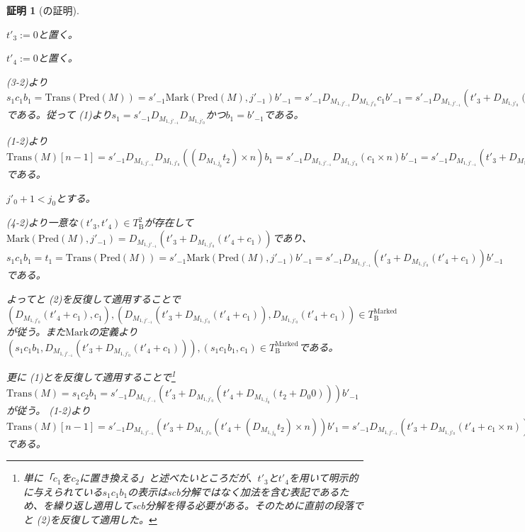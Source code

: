 \documentclass[dvipdfmx,uplatex]{jsarticle}
\theoremstyle{customnonumberbreakfortheorem}
\theoremstyle{customnonumberbreakforproof}
\newtheorem{hideableproof}{証明}
\begin{document}
\begin{hideableproof}[の証明]
\begin{indented}
\begin{indented}
\begin{indented}
				\begin{indented}
					\item \(t'_3 := 0\)と置く。
					\item \(t'_4 := 0\)と置く。
					\item {} (3-2)より\(s_1 c_1 b_1 = \textrm{Trans}(\textrm{Pred}(M)) = s'_{-1} \textrm{Mark}(\textrm{Pred}(M),j'_{-1}) b'_{-1} = s'_{-1} D_{M_{1,j'_{-1}}} D_{M_{1,j'_0}} c_1 b'_{-1} = s'_{-1} D_{M_{1,j'_{-1}}}(t'_3 + D_{M_{1,j'_0}}(t'_4+c_1)) b'_{-1}\)である。従って (1)より\(s_1 = s'_{-1} D_{M_{1,j'_{-1}}} D_{M_{1,j'_0}}\)かつ\(b_1 = b'_{-1}\)である。
					\item {} (1-2)より\(\textrm{Trans}(M)[n-1] = s'_{-1} D_{M_{1,j'_{-1}}} D_{M_{1,j'_0}}((D_{M_{1,j_0}} t_2) \times n) b_1 = s'_{-1} D_{M_{1,j'_{-1}}} D_{M_{1,j'_0}}(c_1 \times n) b'_{-1} = s'_{-1} D_{M_{1,j'_{-1}}}(t'_3 + D_{M_{1,j'_0}}(t'_4 + c_1 \times n)) b'_{-1}\)である。
				\end{indented}
				\item \(j'_0+1 < j_0\)とする。
				\begin{indented}
					\item {} (4-2)より一意な\((t'_3,t'_4) \in T_{\textrm{B}}^2\)が存在して\(\textrm{Mark}(\textrm{Pred}(M),j'_{-1}) = D_{M_{1,j'_{-1}}}(t'_3 + D_{M_{1,j'_0}}(t'_4+c_1))\)であり、\(s_1 c_1 b_1 = t_1 = \textrm{Trans}(\textrm{Pred}(M)) = s'_{-1} \textrm{Mark}(\textrm{Pred}(M),j'_{-1}) b'_{-1} = s'_{-1} D_{M_{1,j'_{-1}}}(t'_3 + D_{M_{1,j'_0}}(t'_4+c_1)) b'_{-1}\)である。
					\item よってと (2)を反復して適用することで\((D_{M_{1,j'_0}}(t'_4+c_1),c_1), (D_{M_{1,j'_{-1}}}(t'_3 + D_{M_{1,j'_0}}(t'_4+c_1)),D_{M_{1,j'_0}}(t'_4+c_1)) \in T_{\textrm{B}}^{\textrm{Marked}}\)が従う。また\(\textrm{Mark}\)の定義より\((s_1 c_1 b_1,D_{M_{1,j'_{-1}}}(t'_3 + D_{M_{1,j'_0}}(t'_4+c_1))), (s_1 c_1 b_1,c_1) \in T_{\textrm{B}}^{\textrm{Marked}}\)である。
					\item 更に (1)とを反復して適用することで\footnote{単に「\(c_1\)を\(c_2\)に置き換える」と述べたいところだが、\(t'_3\)と\(t'_4\)を用いて明示的に与えられている\(s_1 c_1 b_1\)の表示はscb分解ではなく加法を含む表記であるため、を繰り返し適用してscb分解を得る必要がある。そのために直前の段落でと (2)を反復して適用した。}\(\textrm{Trans}(M) = s_1 c_2 b_1 = s'_{-1} D_{M_{1,j'_{-1}}}(t'_3 + D_{M_{1,j'_0}}(t'_4 + D_{M_{1,j_0}}(t_2 + D_0 0))) b'_{-1}\)が従う。 (1-2)より\(\textrm{Trans}(M)[n-1] = s'_{-1} D_{M_{1,j'_{-1}}}(t'_3 + D_{M_{1,j'_0}}(t'_4 + (D_{M_{1,j_0}} t_2) \times n)) b'_1 = s'_{-1} D_{M_{1,j'_{-1}}}(t'_3 + D_{M_{1,j'_0}}(t'_4 + c_1 \times n)) b'_{-1}\)である。

\end{indented}
\end{indented}
\end{indented}
\end{indented}
\end{hideableproof}
\end{document}
